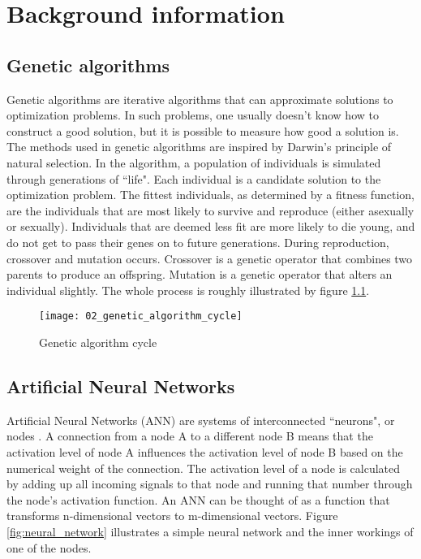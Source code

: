 \chapter{Background information}

\section{Genetic algorithms}
Genetic algorithms \citep{goldberg1989, back1996} are iterative algorithms that can approximate solutions to optimization problems. In such problems, one usually doesn’t know how to construct a good solution, but it is possible to measure how good a solution is. The methods used in genetic algorithms are inspired by Darwin's principle of natural selection. In the algorithm, a population of individuals is simulated through generations of ``life". Each individual is a candidate solution to the optimization problem. The fittest individuals, as determined by a fitness function, are the individuals that are most likely to survive and reproduce (either asexually or sexually). Individuals that are deemed less fit are more likely to die young, and do not get to pass their genes on to future generations. During reproduction, crossover and mutation occurs. Crossover is a genetic operator that combines two parents to produce an offspring. Mutation is a genetic operator that alters an individual slightly. The whole process is roughly illustrated by figure \ref{fig:genetic_algorithm_cycle}.

\begin{figure}[H]
    \centering
    \texttt{[image: 02\_genetic\_algorithm\_cycle]}
    \caption{Genetic algorithm cycle}
    \label{fig:genetic_algorithm_cycle}
\end{figure}

\section{Artificial Neural Networks}
Artificial Neural Networks (ANN) are systems of interconnected ``neurons", or nodes \citep{caudill1987}. A connection from a node A to a different node B means that the activation level of node A influences the activation level of node B based on the numerical weight of the connection. The activation level of a node is calculated by adding up all incoming signals to that node and running that number through the node's activation function. An ANN can be thought of as a function that transforms n-dimensional vectors to m-dimensional vectors. Figure \ref{fig:neural_network} illustrates a simple neural network and the inner workings of one of the nodes.


